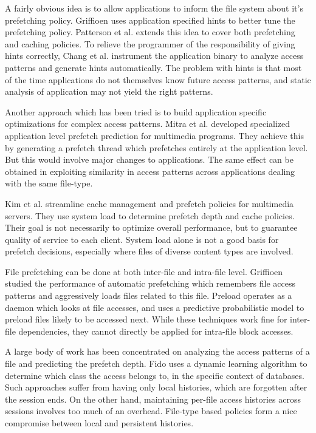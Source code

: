 \documentclass[twocolumn,10pt]{article}
\begin{document}
A fairly obvious idea is to allow applications to inform the file system
about it's prefetching policy. Griffioen \cite{3} uses application
specified hints to better tune the prefetching policy. Patterson et al.
\cite{4} extends this idea to cover both prefetching and caching policies.
To relieve the programmer of the responsibility of giving hints correctly,
Chang et al. \cite{5} instrument the application binary to analyze access
patterns and generate hints automatically.
The problem with hints is that most of the time applications do not themselves
know future access patterns, and static analysis of application may not
yield the right patterns.

Another approach which has been tried is to build application specific
optimizations for complex access patterns. Mitra et al. \cite{8} 
developed specialized application level prefetch prediction for
multimedia programs. They achieve this by generating a prefetch
thread which prefetches entirely at the application level. But
this would involve major changes to applications. The same effect
can be obtained in exploiting similarity in access patterns across
applications dealing with the same file-type.

Kim et al. \cite{10} streamline cache management and prefetch policies
for multimedia servers. They use system load to determine prefetch
depth and cache policies. Their goal is not necessarily to optimize
overall performance, but to guarantee quality of service to each
client. System load alone is not a good basis for prefetch decisions,
especially where files of diverse content types are involved.

File prefetching can be done at both inter-file and intra-file level.
Griffioen \cite{12} studied the performance of automatic prefetching
which remembers file access patterns and aggressively loads files 
related to this file. Preload \cite{11} operates as a daemon which looks at
file accesses, and uses a predictive probabilistic model to preload
files likely to be accessed next. While these techniques work fine
for inter-file dependencies, they cannot directly be applied for
intra-file block accesses.

A large body of work has been concentrated on analyzing the access 
patterns of a file and predicting the prefetch depth. Fido \cite{13}
uses a dynamic learning algorithm to determine which class the
access belongs to, in the specific context of databases. Such 
approaches suffer from having only local histories, which are
forgotten after the session ends. On the other hand, maintaining
per-file access histories across sessions involves too much of an
overhead. File-type based policies form a nice compromise between
local and persistent histories.
\end{document}
